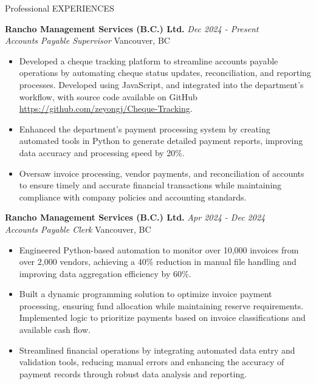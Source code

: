 \documentclass{resume} %
\begin{document}
\begin{rSection}{Professional EXPERIENCES}

{\bf Rancho Management Services (B.C.) Ltd.} \hfill {\em Dec 2024 - Present}  
\\{\textit{Accounts Payable Supervisor} \hfill {Vancouver, BC}}  
\begin{itemize}
    \vspace{-0.2cm}
    \item Developed a cheque tracking platform to streamline accounts payable operations by automating cheque status updates, reconciliation, and reporting processes. Developed using JavaScript, and integrated into the department's workflow, with source code available on GitHub \url{https://github.com/zeyongj/Cheque-Tracking}.  
    \vspace{-0.2cm}
    \item Enhanced the department’s payment processing system by creating automated tools in Python to generate detailed payment reports, improving data accuracy and processing speed by 20\%.  
    \vspace{-0.2cm}
    \item Oversaw invoice processing, vendor payments, and reconciliation of accounts to ensure timely and accurate financial transactions while maintaining compliance with company policies and accounting standards.  
\end{itemize}



{\bf Rancho Management Services (B.C.) Ltd.} \hfill {\em Apr 2024 - Dec 2024} 
\\{\textit{Accounts Payable Clerk} \hfill {Vancouver, BC}}
\begin{itemize}
    \vspace{-0.2cm}\item Engineered Python-based automation to monitor over 10,000 invoices from over 2,000 vendors, achieving a 40\% reduction in manual file handling and improving data aggregation efficiency by 60\%.
    \vspace{-0.2cm}\item Built a dynamic programming solution to optimize invoice payment processing, ensuring fund allocation while maintaining reserve requirements. Implemented logic to prioritize payments based on invoice classifications and available cash flow.
    \vspace{-0.2cm}\item Streamlined financial operations by integrating automated data entry and validation tools, reducing manual errors and enhancing the accuracy of payment records through robust data analysis and reporting.
\end{itemize}


\end{rSection}
\end{document}
